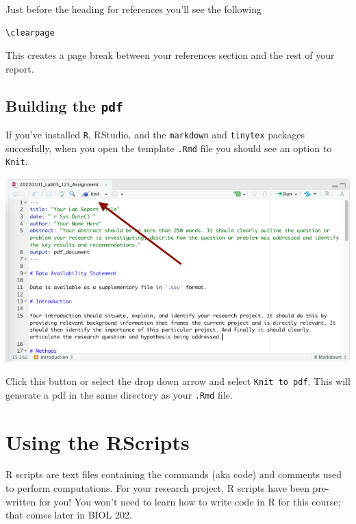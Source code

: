 \documentclass[
]{book}
\begin{document}
Just before the heading for references you'll see the following

\begin{verbatim}
\clearpage
\end{verbatim}

This creates a page break between your references section and the rest of your report.

\hypertarget{building-the-pdf}{%
\subsection*{\texorpdfstring{Building the \texttt{pdf}}{Building the pdf}}\label{building-the-pdf}}

If you've installed \texttt{R}, RStudio, and the \texttt{markdown} and \texttt{tinytex} packages succesfully, when you open the template \texttt{.Rmd} file you should see an option to \texttt{Knit}.

\includegraphics{images/Knit_20220101.png}

Click this button or select the drop down arrow and select \texttt{Knit\ to\ pdf}. This will generate a pdf in the same directory as your \texttt{.Rmd} file.

\hypertarget{using-the-rscripts}{%
\section*{Using the RScripts}\label{using-the-rscripts}}

R scripts are text files containing the commands (aka code) and comments used to perform computations. For your research project, R scripts have been pre-written for you! You won't need to learn how to write code in R for this course; that comes later in BIOL 202.
\end{document}
